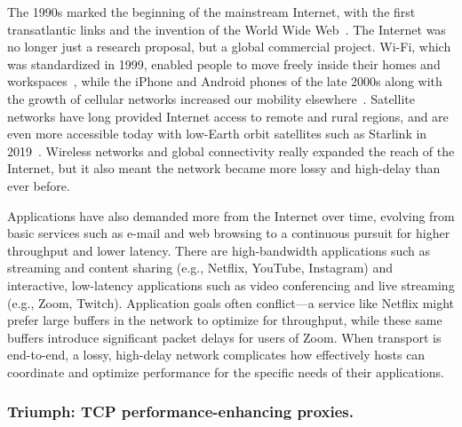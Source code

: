 The 1990s marked the beginning of the mainstream Internet, with the first
transatlantic links and the invention of the World Wide Web~\cite{www2025}. The
Internet was no longer just a research proposal, but a global commercial
project. Wi-Fi, which was
standardized in 1999, enabled people to move freely inside their homes and
workspaces~\cite{wifi2023}, while the iPhone and Android phones of the late
2000s along with the growth of cellular networks increased our mobility
elsewhere~\cite{smartphones2024}. Satellite
networks have long provided Internet access to remote and rural regions, and
are even more accessible today with low-Earth orbit satellites such as Starlink
in 2019~\cite{starlink2025}. Wireless networks and global connectivity really
expanded the reach of the Internet, but it also meant the network became more
lossy and high-delay than ever before.

Applications have also demanded more from the Internet over time, evolving from
basic services such as e-mail and web browsing to a continuous pursuit for
higher throughput and lower latency. There are high-bandwidth applications such
as streaming and content sharing (e.g., Netflix, YouTube, Instagram) and
interactive, low-latency applications such as video conferencing and live
streaming (e.g., Zoom, Twitch). Application goals often conflict---a service
like Netflix might prefer large buffers in the network to optimize for
throughput, while these same buffers introduce significant packet delays for
users of Zoom. When transport is end-to-end, a lossy, high-delay network
complicates how effectively hosts can coordinate and optimize performance for
the specific needs of their applications.

\subsubsection{Triumph: TCP performance-enhancing proxies.}



